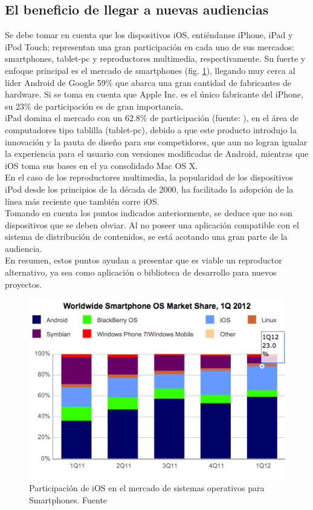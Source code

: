 \subsection{El beneficio de llegar a nuevas audiencias}
Se debe tomar en cuenta que los dispositivos iOS, entiéndanse iPhone, iPad y iPod Touch; representan una gran participación en cada uno de sus mercados: smartphones, tablet-pc y reproductores  multimedia, respectivamente. Su fuerte y enfoque principal es el mercado de smartphones (fig. \ref{market-share-2012q1}), llegando muy cerca al líder Android de Google 59\% que abarca una gran cantidad de fabricantes de hardware. Si se toma en cuenta que Apple Inc. es el único fabricante del iPhone, su 23\% de participación es de gran importancia.\\

iPad domina el mercado con un 62.8\% de participación (fuente: \cite{sota:iPad-market}), en el área de computadores tipo tablilla (tablet-pc), debido a que este producto introdujo la innovación y la pauta de diseño para sus competidores, que aun no logran igualar la experiencia para el usuario con versiones modificadas de Android, mientras que iOS toma sus bases en el ya consolidado Mac OS X.\\

En el caso de los reproductores multimedia, la popularidad de los dispositivos iPod desde los principios de la década de 2000, ha facilitado la adopción de la línea más reciente que también corre iOS.\\

Tomando en cuenta los puntos indicados anteriormente, se deduce que no son dispositivos que se deben obviar. Al no poseer una aplicación compatible con el sistema de distribución de contenidos, se está acotando una gran parte de la audiencia.\\

En resumen, estos puntos ayudan a presentar que es viable un reproductor alternativo, ya sea como aplicación o biblioteca de desarrollo para nuevos proyectos. \\

\begin{figure}[H]
	\centering
	\includegraphics[scale=0.8]{imgs/market-share-2012q1.png} 
	\caption{Participación de iOS en el mercado de sistemas operativos para Smartphones. Fuente \cite{sota:market-smartphones}}
	\label{market-share-2012q1}
\end{figure}



